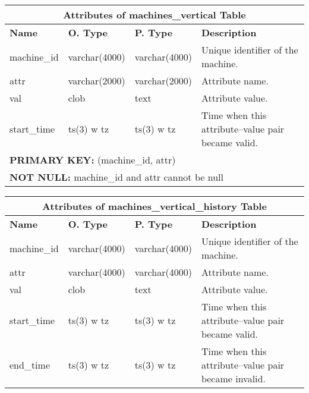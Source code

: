 \begin{center}
  \begin{tabular}{|l|l|l|p{3.2in}|}\hline
    \multicolumn{4}{|c|}{\textbf{Attributes of machines\_vertical Table}}\\ \hline
    \textbf{Name} & \textbf{O. Type} & \textbf{P. Type} & \textbf{Description}\\ \hline
    machine\_id & varchar(4000) & varchar(4000) & Unique identifier of the machine.\\ \hline
    attr & varchar(2000) & varchar(2000) & Attribute name.\\ \hline
    val & clob & text & Attribute value.\\ \hline
    start\_time & ts(3) w tz & ts(3) w tz & Time when this attribute--value pair became valid.\\ \hline
    \multicolumn{4}{|l|}{\textbf{PRIMARY KEY:} (machine\_id, attr)} \\ \hline
    \multicolumn{4}{|l|}{\textbf{NOT NULL:} machine\_id and attr cannot be null} \\ \hline
  \end{tabular}
\vspace{24pt}

  \begin{tabular}{|l|l|l|p{3.2in}|}\hline
    \multicolumn{4}{|c|}{\textbf{Attributes of machines\_vertical\_history Table}}\\ \hline
    \textbf{Name} & \textbf{O. Type} & \textbf{P. Type} & \textbf{Description}\\ \hline
    machine\_id & varchar(4000) & varchar(4000) & Unique identifier of the machine.\\ \hline
    attr & varchar(4000) & varchar(4000) & Attribute name.\\ \hline
    val & clob & text & Attribute value.\\ \hline
    start\_time & ts(3) w tz & ts(3) w tz & Time when this attribute--value pair became valid.\\ \hline
    end\_time & ts(3) w tz & ts(3) w tz & Time when this attribute--value pair became invalid.\\ \hline
  \end{tabular}
\vspace{24pt}
\end{center}


